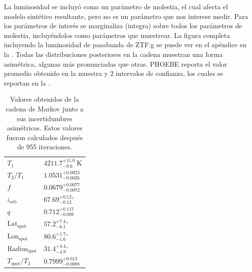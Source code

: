 La luminosidad se incluyó como un parámetro de molestia, el cual afecta el
modelo sintético resultante, pero no es un parámetro que nos interese medir.
Para los parámetros de interés se marginaliza (integra) sobre todos los
parámetros de molestia, incluyéndolos como parámetros que muestrear. La figura
completa incluyendo la luminosidad de pasabanda de ZTF:g se puede ver en el
apéndice en la . Todas las
distribuciones posteriores en la cadena muestran una forma asimétrica, algunas
más pronunciadas que otras. PHOEBE reporta el valor promedio obtenido en la
muestra y 2 intervalos de confianza, los cuales se reportan en la
.

{\renewcommand{\arraystretch}{1.5}%
\begin{table}[!ht]
	\centering
	\begin{tabular}{|P{2.5cm}|P{4cm}|}
		\hline
		                        &  \\
		\hline
		$T_{ 1 }$ & $4211.7^{ +11.0 }_{ -9.6 } ~\mathrm{K}$ \\
		\hline 
		$T_2 / T_1 $ & $1.0531^{ +0.0023 }_{ -0.0026 } \mathrm{}$ \\
		\hline 
		$f$ & $0.0679^{ +0.0077 }_{ -0.0072 } \mathrm{}$ \\
		\hline 
		$i_\mathrm{ orb }$ & $67.69^{ +0.12 }_{ -0.12 } \mathrm{{}^{\circ}}$ \\
		\hline 
		$q$ & $0.712^{ +0.117 }_{ -0.089 } \mathrm{}$ \\
		\hline 
		$\mathrm{ Lat }_{\mathrm{spot}}$ & $57.2^{ +7.4 }_{ -6.1 } \mathrm{{}^{\circ}}$ \\
		\hline 
		$\mathrm{ Lon }_{\mathrm{spot}}$ & $80.6^{ +1.7 }_{ -1.6 } \mathrm{{}^{\circ}}$ \\
		\hline 
		$\mathrm{ Radius }_{\mathrm{spot}}$ & $31.4^{ +4.4 }_{ -4.9 } \mathrm{{}^{\circ}}$ \\
		\hline 
		$T_{\mathrm{spot}} / T_2$ & $0.7999^{ +0.013 }_{ -0.0088 } \mathrm{}$ \\
		\hline 
	\end{tabular}
	\caption{Valores obtenidos de la cadena de Markov junto a sus incertidumbres
	asimétricas. Estos valores fueron calculados después de 955 iteraciones.}
	\label{tablaMcmcResultadosIncertidumbres}
\end{table}}

\newpage

